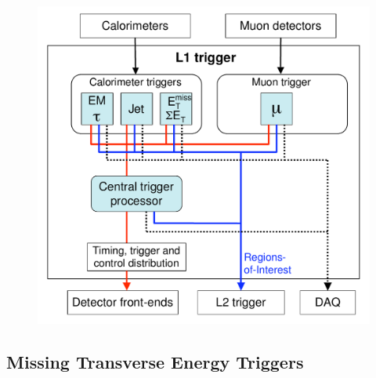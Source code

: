 \begin{figure}[hbtp]
\includegraphics[width=\fullfig]{figures/l1_diagram.pdf}
\caption{}
\label{fig:l1_diagram}
\end{figure}

\subsection{Missing Transverse Energy Triggers}

